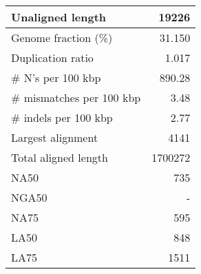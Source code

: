 \documentclass[12pt,a4paper]{article}
\begin{document}
\begin{table}[ht]
\begin{center}
\begin{tabular}{|l*{1}{|r}|}
Unaligned length & 19226 \\ \hline
Genome fraction (\%) & 31.150 \\ \hline
Duplication ratio & 1.017 \\ \hline
\# N's per 100 kbp & 890.28 \\ \hline
\# mismatches per 100 kbp & 3.48 \\ \hline
\# indels per 100 kbp & 2.77 \\ \hline
Largest alignment & 4141 \\ \hline
Total aligned length & 1700272 \\ \hline
NA50 & 735 \\ \hline
NGA50 & - \\ \hline
NA75 & 595 \\ \hline
LA50 & 848 \\ \hline
LA75 & 1511 \\ \hline
\end{tabular}
\end{center}
\end{table}
\end{document}
